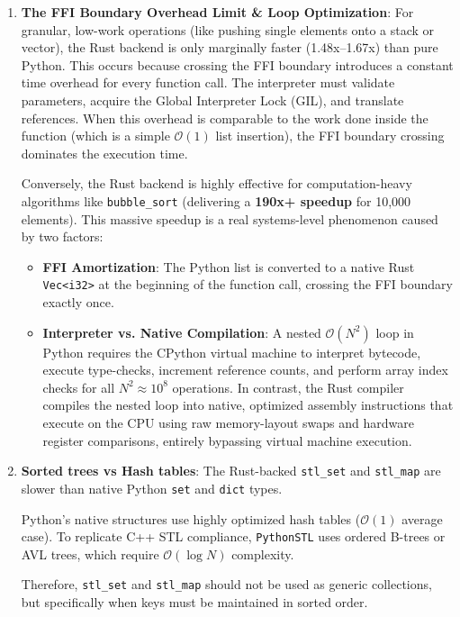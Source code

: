 \documentclass[11pt,a4paper]{article}
\begin{document}
\begin{enumerate}
    \item \textbf{The FFI Boundary Overhead Limit \& Loop Optimization}:
    For granular, low-work operations (like pushing single elements onto a stack or vector), the Rust backend is only marginally faster (1.48x--1.67x) than pure Python. This occurs because crossing the FFI boundary introduces a constant time overhead for every function call. The interpreter must validate parameters, acquire the Global Interpreter Lock (GIL), and translate references. When this overhead is comparable to the work done inside the function (which is a simple $\mathcal{O}(1)$ list insertion), the FFI boundary crossing dominates the execution time.
    
    Conversely, the Rust backend is highly effective for computation-heavy algorithms like \texttt{bubble\_sort} (delivering a \textbf{190x+ speedup} for 10,000 elements). This massive speedup is a real systems-level phenomenon caused by two factors:
    \begin{itemize}
        \item \textbf{FFI Amortization}: The Python list is converted to a native Rust \texttt{Vec<i32>} at the beginning of the function call, crossing the FFI boundary exactly once.
        \item \textbf{Interpreter vs. Native Compilation}: A nested $\mathcal{O}(N^2)$ loop in Python requires the CPython virtual machine to interpret bytecode, execute type-checks, increment reference counts, and perform array index checks for all $N^2 \approx 10^8$ operations. In contrast, the Rust compiler compiles the nested loop into native, optimized assembly instructions that execute on the CPU using raw memory-layout swaps and hardware register comparisons, entirely bypassing virtual machine execution.
    \end{itemize}
    
    \item \textbf{Sorted trees vs Hash tables}:
    The Rust-backed \texttt{stl\_set} and \texttt{stl\_map} are slower than native Python \texttt{set} and \texttt{dict} types. 
    
    Python's native structures use highly optimized hash tables ($\mathcal{O}(1)$ average case). To replicate C++ STL compliance, \texttt{PythonSTL} uses ordered B-trees or AVL trees, which require $\mathcal{O}(\log N)$ complexity.
    
    Therefore, \texttt{stl\_set} and \texttt{stl\_map} should not be used as generic collections, but specifically when keys must be maintained in sorted order.
\end{enumerate}
\end{document}
